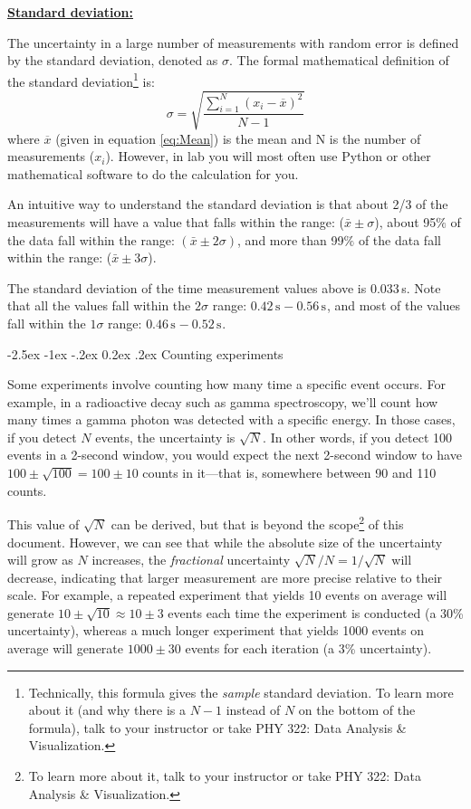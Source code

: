 \documentclass[11pt]{article}
\makeatletter
\renewcommand\u[2][]{\ensuremath{\,\text{#2}^{#1}}}
\renewcommand\subsection{\@startsection {subsection}{2}{\z@}%
     {-2.5ex \@plus -1ex \@minus -.2ex}%
     {0.2ex \@plus.2ex}%
    {\bfseries\large}}
\makeatother
\begin{document}
\textbf{\underline{Standard deviation:}}

The uncertainty in a large number of measurements with random error is defined 
by the standard deviation, denoted as $\sigma$. The formal mathematical 
definition of the standard deviation\footnote{Technically, this formula gives the \textit{sample} standard deviation. To learn more about it (and why there is a $N-1$ instead of $N$ on the bottom of the formula), talk to your instructor or take PHY 322: Data Analysis \& Visualization.} is:
\begin{equation}
\sigma = \sqrt{\frac{\sum_{i=1}^{N}\left(x_{i}-\overline{x}\right)^{2}}{N-1}}
\label{eq:Std}
\end{equation}
where $\overline{x}$ (given in equation \ref{eq:Mean}) is the mean and N is the 
number of measurements ($x_{i}$). However, in lab you will most often use Python 
or other mathematical software to do the calculation for you.

An intuitive way to understand the standard deviation is that about 2/3 of the 
measurements will have a value that falls within the range: ($\bar{x}\pm\sigma$), about 95$\%$ of the data fall within the range: $(\bar{x}\pm 
2\sigma)$, and more than 99$\%$ of the data fall within the range: ($\bar{x}\pm 3\sigma$).

The standard deviation of the time measurement values above is $0.033\,$s. Note 
that all the values fall within the $2\sigma$ range: $0.42\u{s} - 0.56\u{s}$, and most 
of the values fall within the $1\sigma$ range: $0.46\u{s} - 0.52\u{s}$.

\subsection{Counting experiments}

Some experiments involve counting how many time a specific event occurs. For
example, in a radioactive decay such as gamma spectroscopy, we'll count how many
times a gamma photon was detected with a specific energy. In those cases, if you
detect $N$ events, the uncertainty is $\sqrt{N}$. In other words, if you detect
100 events in a 2-second window, you would expect the next 2-second window to
have $100\pm\sqrt{100}=100\pm10$ counts in it---that is, somewhere between 90 and 110 counts.

This value of $\sqrt{N}$ can be derived, but that is beyond the scope\footnote{To
learn more about it, talk to your instructor or take PHY 322: Data Analysis \& Visualization.}
of this document. However, we can see that while the absolute size of the uncertainty
will grow as $N$ increases, the \textit{fractional} uncertainty 
$\sqrt{N}/N = 1/\sqrt{N}$ will decrease, indicating that larger measurement are more precise 
relative to their scale.
For example, a repeated experiment that yields 10 events on average will generate 
$10\pm\sqrt{10}\approx10\pm3$ events each time the experiment is conducted (a 30\% uncertainty), 
whereas a much longer experiment that yields 1000 events on average will generate
$1000\pm30$ events for each iteration (a 3\% uncertainty).
\end{document}
